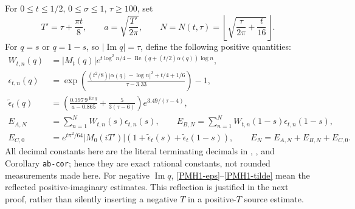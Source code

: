 \documentclass[11pt]{article}
\newcommand{\Rea}{\operatorname{Re}}
\newcommand{\Ima}{\operatorname{Im}}
\newcommand{\Src}[1]{\cite[original TeX label \texttt{#1}]{polymath}}
\begin{document}
For $0\le t\le1/2$, $0\le\sigma\le1$, $\tau\ge100$, set
\begin{equation}\label{PMH1-cutoff}
 T'=\tau+\frac{\pi t}{8},\qquad
 a=\sqrt{\frac{T'}{2\pi}},\qquad
 N=N(t,\tau)=\left\lfloor\sqrt{\frac{\tau}{2\pi}+\frac t{16}}\right\rfloor.
\end{equation}
For $q=s$ or $q=1-s$, so $|\Ima q|=\tau$, define the following
positive quantities:
\begin{align}
 W_{t,n}(q)&=|M_t(q)|
 e^{t\log^2n/4-\Rea(q+(t/2)\alpha(q))\log n},
 \label{PMH1-W}\\
 \epsilon_{t,n}(q)&=
 \exp\left(\frac{(t^2/8)|\alpha(q)-\log n|^2+t/4+1/6}
 {\tau-3.33}\right)-1,
 \label{PMH1-eps}\\
 \widetilde\epsilon_t(q)&=
 \left(\frac{0.397\,9^{\Rea q}}{a-0.865}
       +\frac5{3(\tau-6)}\right)e^{3.49/(\tau-4)},
 \label{PMH1-tilde}\\
 E_{A,N}&=\sum_{n=1}^N W_{t,n}(s)\epsilon_{t,n}(s),
 \qquad E_{B,N}=\sum_{n=1}^N W_{t,n}(1-s)\epsilon_{t,n}(1-s),
 \label{PMH1-EAB}\\
 E_{C,0}&=e^{t\pi^2/64}|M_0(iT')|
       \left(1+\widetilde\epsilon_t(s)+\widetilde\epsilon_t(1-s)\right),
 \qquad E_N=E_{A,N}+E_{B,N}+E_{C,0}.
 \label{PMH1-EC}
\end{align}
All decimal constants here are the literal terminating decimals in
\Src{eps-def}, \Src{epsp-def}, and Corollary \texttt{ab-cor}; hence they
are exact rational constants, not rounded measurements made here.
For negative $\Ima q$, \eqref{PMH1-eps}--\eqref{PMH1-tilde} mean the
reflected positive-imaginary estimates. This reflection is justified
in the next proof, rather than silently inserting a negative $T$ in a
positive-$T$ source estimate.
\end{document}

